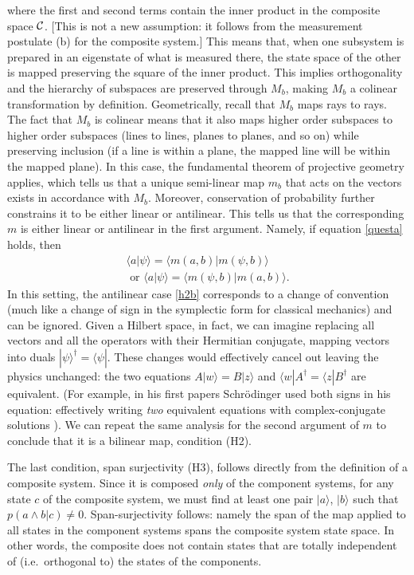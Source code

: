 \documentclass[aps,prl,amsmath,amssymb,twocolumn]{revtex4}
\theoremstyle{plain}
\theoremstyle{definition}
\theoremstyle{remark}
\def\>{\rangle}
\def\<{\langle}
\def\labell#1{\label{#1}}
\begin{document}
	where the first and second terms contain the inner product in the
	composite space $\cal C$. [This is not a new assumption: it follows
	from the measurement postulate (b) for the composite system.] This
	means that, when one subsystem is prepared in an eigenstate of what is
	measured there, the state space of the other is mapped preserving the
	square of the inner product.  This implies orthogonality and the
	hierarchy of subspaces are preserved through $M_b$, making $M_b$ a
	colinear transformation by definition. Geometrically, recall that
	$M_b$ maps rays to rays. The fact that $M_b$ is colinear means that it
	also maps higher order subspaces to higher order subspaces (lines to
	lines, planes to planes, and so on) while preserving inclusion (if a
	line is within a plane, the mapped line will be within the mapped
	plane). In this case, the fundamental theorem of projective geometry
	\cite{fun} applies, which tells us that a unique semi-linear map $m_b$
	that acts on the vectors exists in accordance with $M_b$.  Moreover,
	conservation of probability further constrains it to be either linear
	or antilinear. This tells us that the corresponding $m$ is either
	linear or antilinear in the first argument. Namely, if equation
	\eqref{questa} holds, then
	\begin{align}
	\<a|\psi\>=\<m(a,b)|m(\psi,b)\>\labell{h2}\;
	\\\mbox{ or }
	\<a|\psi\>=\<m(\psi,b)|m(a,b)\> \labell{h2b}.
	\end{align}
	In this setting, the antilinear case \eqref{h2b} corresponds to a
	change of convention (much like a change of sign in the symplectic
	form for classical mechanics) and can be ignored.  Given a Hilbert
	space, in fact, we can imagine replacing all vectors and all the
	operators with their Hermitian conjugate, mapping vectors into duals
	$|\psi\>^\dag=\<\psi|$. These changes would effectively cancel out
	leaving the physics unchanged: the two equations $A|w\>=B|z\>$ and
	$\<w|A^\dag=\<z|B^\dag$ are equivalent.  (For example, in his first
	papers Schr\"odinger used both signs in his equation: effectively
	writing {\em two} equivalent equations with complex-conjugate
	solutions \cite{sch}). We can repeat the same analysis for the second
	argument of $m$ to conclude that it is a bilinear map, condition (H2).
	
	The last condition, span surjectivity (H3), follows directly from the
	definition of a composite system. Since it is composed {\em only} of
	the component systems, for any state $c$ of the composite system, we
	must find at least one pair $|a\>$, $|b\>$ such that
	$p(a\wedge b | c)\neq 0$.  Span-surjectivity follows: namely the span
	of the map applied to all states in the component systems spans the
	composite system state space. In other words, the composite does not
	contain states that are totally independent of (i.e.~orthogonal to)
	the states of the components.
	
\end{document}
